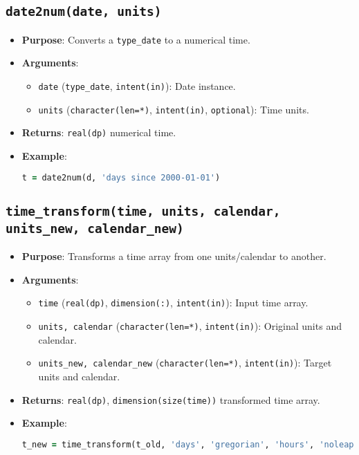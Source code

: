 \documentclass[12pt,a4paper]{report}
\begin{document}
\subsection{\texttt{date2num(date, units)}}
\begin{itemize}
\item \textbf{Purpose}: Converts a \texttt{type\_date} to a numerical time.
\item \textbf{Arguments}:
\begin{itemize}
\item \texttt{date} (\texttt{type\_date}, \texttt{intent(in)}): Date instance.
\item \texttt{units} (\texttt{character(len=*)}, \texttt{intent(in)}, \texttt{optional}): Time units.
\end{itemize}
\item \textbf{Returns}: \texttt{real(dp)} numerical time.
\item \textbf{Example}:
\begin{lstlisting}[language=Fortran]
t = date2num(d, 'days since 2000-01-01')
\end{lstlisting}
\end{itemize}

\subsection{\texttt{time\_transform(time, units, calendar, units\_new, calendar\_new)}}
\begin{itemize}
\item \textbf{Purpose}: Transforms a time array from one units/calendar to another.
\item \textbf{Arguments}:
\begin{itemize}
\item \texttt{time} (\texttt{real(dp)}, \texttt{dimension(:)}, \texttt{intent(in)}): Input time array.
\item \texttt{units, calendar} (\texttt{character(len=*)}, \texttt{intent(in)}): Original units and calendar.
\item \texttt{units\_new, calendar\_new} (\texttt{character(len=*)}, \texttt{intent(in)}): Target units and calendar.
\end{itemize}
\item \textbf{Returns}: \texttt{real(dp)}, \texttt{dimension(size(time))} transformed time array.
\item \textbf{Example}:
\begin{lstlisting}[language=Fortran]
t_new = time_transform(t_old, 'days', 'gregorian', 'hours', 'noleap')
\end{lstlisting}
\end{itemize}
\end{document}

